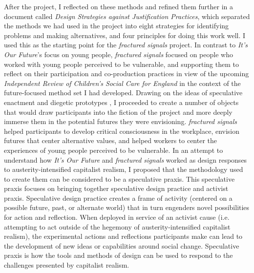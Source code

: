 After the project, I reflected on these methods and refined them further in a document called \textit{Design Strategies against Justification Practices}, which separated the methods we had used in the project into eight strategies for identifying problems and making alternatives, and four principles for doing this work well. I used this as the starting point for the \textit{fractured signals} project. In contrast to \textit{It's Our Future}'s focus on young people, \textit{fractured signals} focused on people who worked with young people perceived to be vulnerable, and supporting them to reflect on their participation and co-production practices in view of the upcoming \textit{Independent Review of Children's Social Care for England} in the context of the future-focused method set I had developed. Drawing on the ideas of speculative enactment \citep{elsden_speculative_2017} and diegetic prototypes \citep{kirby_future_2010}, I proceeded to create a number of objects that would draw participants into the fiction of the project and more deeply immerse them in the potential futures they were envisioning. \textit{fractured signals} helped participants to develop critical consciousness in the workplace, envision futures that center alternative values, and helped workers to center the experiences of young people perceived to be vulnerable.  In an attempt to understand how \textit{It's Our Future} and \textit{fractured signals} worked as design responses to austerity-intensified capitalist realism, I proposed that the methodology used to create them can be considered to be a speculative praxis. This speculative praxis focuses on bringing together speculative design practice and activist praxis. Speculative design practice creates a frame of activity (centered on a possible future, past, or alternate world) that in turn engenders novel possibilities for action and reflection. When deployed in service of an activist cause (i.e. attempting to act outside of the hegemony of austerity-intensified capitalist realism), the experimental actions and reflections participants make can lead to the development of new ideas or capabilities around social change. Speculative praxis is how the tools and methods of design can be used to respond to the challenges presented by capitalist realism.

